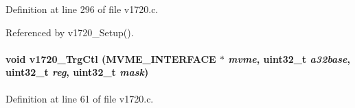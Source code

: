 Definition at line 296 of file v1720.c.

Referenced by v1720\_\-Setup().
\paragraph[{v1720\_\-TrgCtl}]{\setlength{\rightskip}{0pt plus 5cm}void v1720\_\-TrgCtl ({\bf MVME\_\-INTERFACE} $\ast$ {\em mvme}, \/  uint32\_\-t {\em a32base}, \/  uint32\_\-t {\em reg}, \/  uint32\_\-t {\em mask})}\hfill\label{v1720drv_8h_a93ac23f5fe5dc6e2f780b2bb38a4eda8}


Definition at line 61 of file v1720.c.